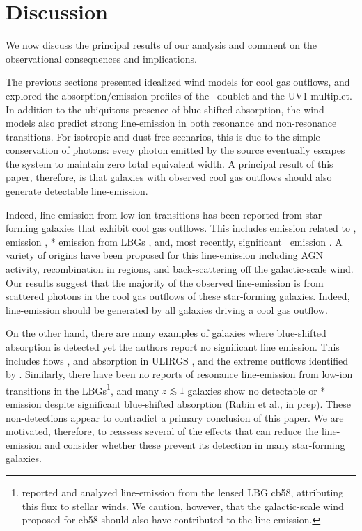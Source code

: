 \documentclass[12pt,preprint]{aastex}
\begin{document}
\section{Discussion}
\label{sec:discuss}

We now discuss the principal results of our analysis and comment on
the observational consequences and implications. 

The previous sections presented idealized wind models for
cool gas outflows, and explored the absorption/emission profiles of
the \mgiid\ doublet and the  UV1 multiplet.  In addition to
the ubiquitous presence of blue-shifted absorption, the wind models
also predict strong line-emission in both resonance
and non-resonance transitions.  For isotropic and dust-free scenarios,
this is 
due to the 
simple conservation of photons: every photon emitted by
the source eventually escapes the system to maintain
zero total equivalent width. A principal result of this paper,
therefore, is that galaxies with observed cool gas outflows should
also generate detectable line-emission.
 
Indeed, line-emission from low-ion transitions has been reported from 
star-forming galaxies that exhibit cool gas outflows.  
This includes emission related to  \citep{phillips93,cth+10},
 emission \citep{wcp+09,rwk+10}, 
* emission from LBGs \citep{shapley03},
and, most recently, significant \feiis\ emission \citep{rubin+10c}. 
A variety of origins have been proposed for this
line-emission including AGN activity, recombination in 
regions, and back-scattering off the galactic-scale wind.
Our results suggest that the majority of the observed line-emission is 
from scattered photons in the cool gas outflows of these star-forming
galaxies.  Indeed, line-emission should be generated by all 
galaxies driving a cool gas outflow.

On the other hand,
there are many examples of galaxies where blue-shifted absorption is
detected yet the authors report no significant line emission.  This
includes  flows \citep{rvs05a,martin05,smn+09}, 
 and  absorption in
ULIRGS \citep{mb09}, and the extreme  outflows identified
by \cite{tmd07}.  Similarly, there have been no reports of
resonance line-emission from low-ion transitions in the
LBGs\footnote{\citet{psa+00}
  reported and analyzed  line-emission from the lensed LBG
  cb58, attributing this flux to stellar winds.  We caution, however,
  that the galactic-scale wind proposed for cb58 should also
  have contributed to the  line-emission.}, and many
$z \lesssim 1$ galaxies show no detectable  or *
emission despite significant blue-shifted absorption (Rubin et al., in prep). 
These non-detections appear to contradict a primary conclusion of 
this paper.   We are motivated, therefore, to
reassess several of the effects that can reduce the line-emission
and consider whether these prevent its detection in many
star-forming galaxies.  
\end{document}
